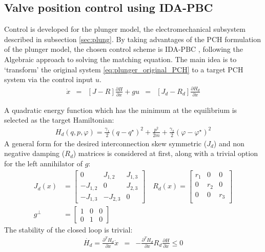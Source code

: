 \documentclass[letterpaper, 10pt, conference]{ieeeconf}
\begin{document}
\subsection{Valve position control using IDA-PBC}
Control is developed for the plunger model, the electromechanical subsystem described in subsection \ref{sec:plung}.
By taking advantages of the PCH formulation of the plunger model, the chosen control scheme is IDA-PBC \cite{IDAPBC}, following the Algebraic approach to solving the matching equation. The main idea is to `transform' the original system \eqref{eq:plunger_original_PCH} to a target PCH system via the control input $u$. 
\begin{equation}
    \begin{aligned}
    \dot{x} &=& [J-R]\frac{\partial H}{\partial x} + gu &=& [J_{d}- R_{d}]\frac{\partial H_{d}}{\partial x}
\end{aligned}\label{eq:IDA_principle}
\end{equation}

A quadratic energy function which has the minimum at the equilibrium is selected as the target Hamiltonian:
\begin{align}
    H_d(q,p,\varphi) = \frac{\gamma_1}{2} (q-q^\star)^2 + \frac{p^2}{2m} + \frac{\gamma_2}{2}(\varphi-\varphi^\star)^2
    \label{eq:Hd}
\end{align}
A general form for the desired interconnection skew symmetric ($J_d$) and non negative damping ($R_d$) matrices is considered at first, along with a trivial option for the left annihilator of $g$:
\begin{equation}
    \begin{aligned}
    J_{d}(x) &= \begin{bmatrix}
        0 & J_{1,2} & J_{1,3}\\
        -J_{1,2} & 0 & J_{2,3}\\
        -J_{1,3} & -J_{2,3} & 0
    \end{bmatrix} \quad R_{d}(x) = \begin{bmatrix}
        r_{1} & 0 & 0\\
        0 & r_{2} & 0\\
        0 & 0 & r_{3}\\
    \end{bmatrix} \\
    g^\perp &= \begin{bmatrix}
        1 & 0 & 0\\ 
        0 & 1 & 0
    \end{bmatrix}
\end{aligned}\label{eq:JRd}
\end{equation}
The stability of the closed loop is trivial:
\begin{equation}
    \begin{aligned}
    \dot{H_{d}} = \frac{\partial^T H_{d}}{\partial x} \dot{x} &=& -\frac{\partial^T H_{d}}{\partial x} R_{d}\frac{\partial H}{\partial x}  \leq 0
\end{aligned}\label{eq:IDA_stab}
\end{equation}
\end{document}
